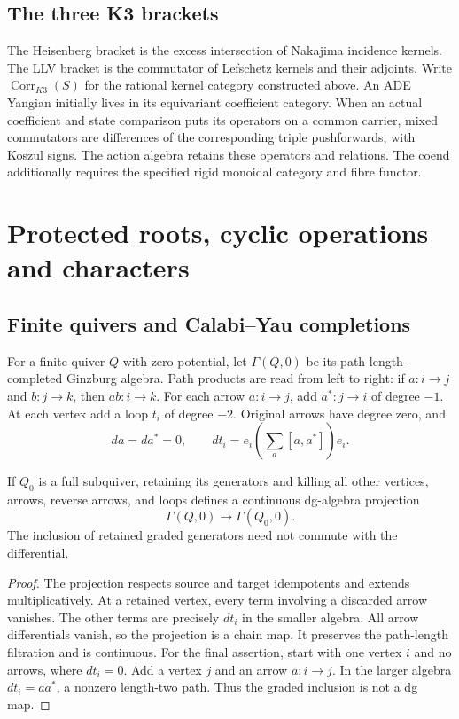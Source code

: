 \section{The three K3 brackets}
The Heisenberg bracket is the excess intersection of Nakajima
incidence kernels. The LLV bracket is the commutator of Lefschetz
kernels and their adjoints. Write $\operatorname{Corr}_{K3}(S)$ for
the rational kernel category constructed above. An ADE Yangian
initially lives in its equivariant coefficient category. When an actual
coefficient and state comparison puts its operators on a common
carrier, mixed commutators are differences of the corresponding
triple pushforwards, with Koszul signs. The action algebra retains
these operators and relations. The coend additionally requires the
specified rigid monoidal category and fibre functor.

\chapter{Protected roots, cyclic operations and characters}

\section{Finite quivers and Calabi--Yau completions}
For a finite quiver $Q$ with zero potential, let $\Gamma(Q,0)$ be its
path-length-completed Ginzburg algebra.
Path products are read from left to right: if $a:i\to j$ and
$b:j\to k$, then $ab:i\to k$.
For each arrow $a:i\to j$, add $a^*:j\to i$ of degree $-1$.
At each vertex add a loop $t_i$ of degree $-2$.
Original arrows have degree zero, and
\[
 da=da^*=0,\qquad
 dt_i=e_i\left(\sum_a[a,a^*]\right)e_i.
\]

\begin{proposition}\label{cyiv:ginzburg-projection}
If $Q_0$ is a full subquiver, retaining its generators and killing all
other vertices, arrows, reverse arrows, and loops defines a continuous
dg-algebra projection
\[
 \Gamma(Q,0)\longrightarrow\Gamma(Q_0,0).
\]
The inclusion of retained graded generators need not commute with
the differential.
\end{proposition}
\begin{proof}
The projection respects source and target idempotents and extends
multiplicatively.
At a retained vertex, every term involving a discarded arrow vanishes.
The other terms are precisely $dt_i$ in the smaller algebra.
All arrow differentials vanish, so the projection is a chain map.
It preserves the path-length filtration and is continuous.
For the final assertion, start with one vertex $i$ and no arrows,
where $dt_i=0$.
Add a vertex $j$ and an arrow $a:i\to j$.
In the larger algebra $dt_i=aa^*$, a nonzero length-two path.
Thus the graded inclusion is not a dg map.
\end{proof}

